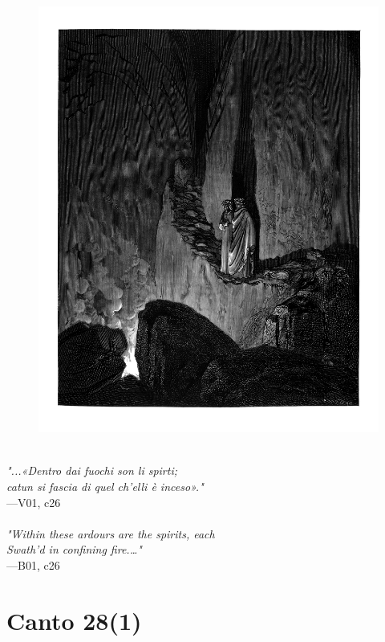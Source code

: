 \documentclass[../Dore_vision.tex]{subfiles}
\begin{document}
\begin{figure}[ht]
\centering
\includegraphics[height=\figsize]{illustrations/book_1/V01, c26.jpg}
\end{figure}

\begin{center}
\begin{minipage}{0.8\linewidth}
\textit{\\
"...«Dentro dai fuochi son li spirti;\\catun si fascia di quel ch’elli è inceso»."} \\
—V01, c26 \\~\\
\textit{"Within these ardours are the spirits, each\\Swath'd in confining fire.\textquotesingle…"} \\
—B01, c26
\end{minipage}
\end{center}

\newpage

\section{Canto 28(1)}
\end{document}
